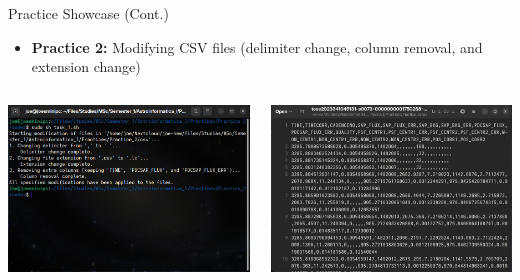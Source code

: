 \documentclass[12pt, aspectratio=169]{beamer}
\begin{document}
  \begin{frame}[t]{Practice Showcase (Cont.)}
    \begin{itemize}
      \item \textbf{Practice 2:} Modifying CSV files (delimiter change,
      column removal, and extension change) \vspace{2.5mm}
    \end{itemize}
    \begin{columns}
      \begin{column}{0.5\textwidth}
        \centering
        \includegraphics[width=\linewidth]{figures/2-1.png}
      \end{column}
      \begin{column}{0.5\textwidth}
        \centering
        \includegraphics[width=\linewidth]{figures/2-2.png}
      \end{column}
    \end{columns}
  \end{frame}
\end{document}
